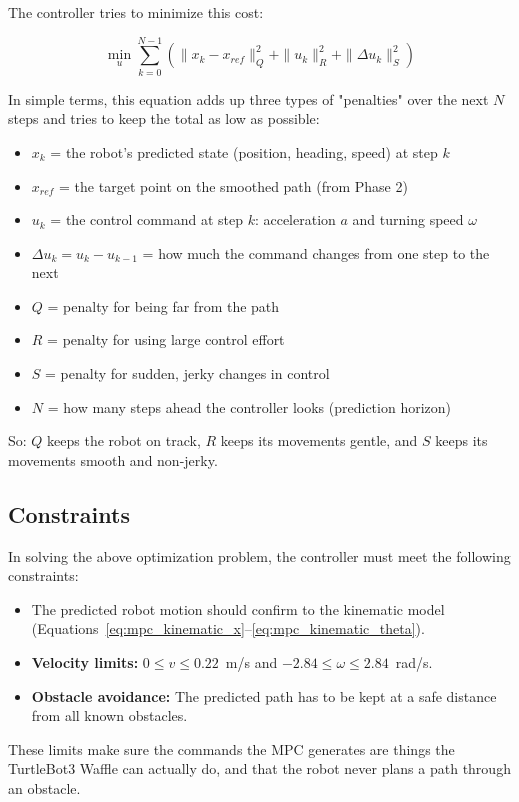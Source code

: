 The controller tries to minimize this cost:

\begin{equation}
	\min_{u} \sum_{k=0}^{N-1} \left( \|x_k - x_{ref}\|^2_Q + \|u_k\|^2_R + \|\Delta u_k\|^2_S \right)
	\label{eq:mpc_cost_p3}
\end{equation}

In simple terms, this equation adds up three types of "penalties" over the next $N$ steps and tries to keep the total as low as possible:

\begin{itemize}[noitemsep]
	\item $x_k$ = the robot's predicted state (position, heading, speed) at step $k$
	\item $x_{ref}$ = the target point on the smoothed path (from Phase 2)
	\item $u_k$ = the control command at step $k$: acceleration $a$ and turning speed $\omega$
	\item $\Delta u_k = u_k - u_{k-1}$ = how much the command changes from one step to the next
	\item $Q$ = penalty for being far from the path
	\item $R$ = penalty for using large control effort
	\item $S$ = penalty for sudden, jerky changes in control
	\item $N$ = how many steps ahead the controller looks (prediction horizon)
\end{itemize}

So: $Q$ keeps the robot on track, $R$ keeps its movements gentle, and $S$ keeps its movements smooth and non-jerky.

\subsection{Constraints}
\label{subsec:mpc_constraints}
In solving the above optimization problem, the controller must meet the following constraints:

\begin{itemize}[noitemsep]
	\item The predicted robot motion should confirm to the kinematic model (Equations~\ref{eq:mpc_kinematic_x}--\ref{eq:mpc_kinematic_theta}).
	\item \textbf{Velocity limits:} $0 \leq v \leq 0.22$~m/s and $-2.84 \leq \omega \leq 2.84$~rad/s.
	\item \textbf{Obstacle avoidance:} The predicted path has to be kept at a safe distance from all known obstacles.
\end{itemize}
These limits make sure the commands the MPC generates are things the TurtleBot3 Waffle can actually do, and that the robot never plans a path through an obstacle.

